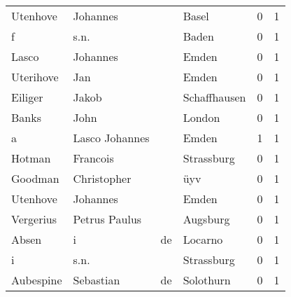 \begin{tabular}{llllrr}
                 Utenhove &                           Johannes &             &                                       Basel &          0 &         1 \\
                        f &                               s.n. &             &                                       Baden &          0 &         1 \\
                    Lasco &                           Johannes &             &                                       Emden &          0 &         1 \\
                Uterihove &                                Jan &             &                                       Emden &          0 &         1 \\
                  Eiliger &                              Jakob &             &                                Schaffhausen &          0 &         1 \\
                    Banks &                               John &             &                                      London &          0 &         1 \\
                        a &                     Lasco Johannes &             &                                       Emden &          1 &         1 \\
                   Hotman &                           Francois &             &                                  Strassburg &          0 &         1 \\
                  Goodman &                        Christopher &             &                                         üyv &          0 &         1 \\
                 Utenhove &                           Johannes &             &                                       Emden &          0 &         1 \\
                Vergerius &                      Petrus Paulus &             &                                    Augsburg &          0 &         1 \\
                    Absen &                                  i &          de &                                     Locarno &          0 &         1 \\
                        i &                               s.n. &             &                                  Strassburg &          0 &         1 \\
                Aubespine &                          Sebastian &          de &                                   Solothurn &          0 &         1 \\

\end{tabular}
